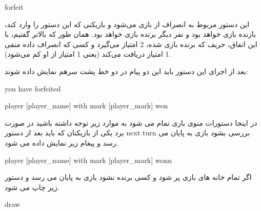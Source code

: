 \documentclass[]{article}
\begin{document}
\hrulefill

\newpage

\begin{tcolorbox}[boxrule=0pt]
	\begin{latin}
  	  \large{
  	  	forfeit
		}
	\end{latin}
\end{tcolorbox}

این دستور مربوط به انصراف از بازی می‌شود و بازیکنی که این دستور را وارد کند، بازنده بازی خواهد بود و نفر دیگر برنده بازی خواهد بود. همان طور که بالاتر گفتیم، با این اتفاق، حریف که برنده بازی شده، 2 امتیاز می‌گیرد و کسی که انصراف داده منفی 1 امتیاز دریافت می‌کند (یعنی 1 امتیاز از او کم می‌شود).

بعد از اجرای این دستور باید این دو پیام در دو خط پشت سرهم نمایش داده شوند:



\begin{tcolorbox}[boxrule=0pt]
	\begin{latin}
  	  \large{
  	  	you have forfeited
		}
	\end{latin}
\end{tcolorbox}


\begin{tcolorbox}[boxrule=0pt]
	\begin{latin}
  	  \large{
  	  	player [player\_name] with mark [player\_mark] won
		}
	\end{latin}
\end{tcolorbox}

\hrulefill


در اینجا دستورات منوی بازی تمام می شود به موارد زیر توجه داشته باشید
در صورت برد یکی از بازیکنان که باید بعد از دستور next turn بررسی بشود بازی به پایان می رسد و پیغام زیر نمایش داده می شود.



\begin{tcolorbox}[boxrule=0pt]
	\begin{latin}
  	  \large{
  	  	player [player\_name] with mark [player\_mark] wonn
		}
	\end{latin}
\end{tcolorbox}

اگر تمام خانه های بازی پر شود و کسی برنده نشود بازی به پایان می رسد و دستور زیر چاپ می شود.

\begin{tcolorbox}[boxrule=0pt]
	\begin{latin}
  	  \large{
  	  	draw
		}
	\end{latin}
\end{tcolorbox}
\end{document}
